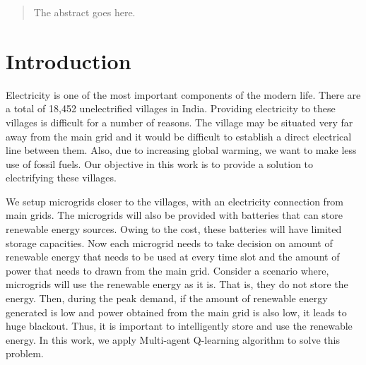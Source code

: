 \documentclass[conference]{IEEEtran}
\begin{document}
\maketitle

\begin{abstract}
The abstract goes here.
\end{abstract}





%
\IEEEpeerreviewmaketitle



\section{Introduction}

Electricity is one of the most important components of the modern life. There are a total of 18,452 unelectrified villages in India. Providing electricity to these villages is difficult for a number of reasons. The village may be situated very far away from the main grid and it would be difficult to establish a direct electrical line between them. Also, due to increasing global warming, we want to make less use of fossil fuels. Our objective in this work is to provide a solution to electrifying these villages.

We setup microgrids closer to the villages, with an electricity connection from main grids. The microgrids will also be provided with batteries that can store renewable energy sources. Owing to the cost, these batteries will have limited storage capacities. Now each microgrid needs to take decision on amount of renewable energy that needs to be used at every time slot and the amount of power that needs to drawn from the main grid. Consider a scenario where, microgrids will use the renewable energy as it is. That is, they do not store the energy. Then, during the peak demand, if the amount of renewable energy generated is low and power obtained from the main grid is also low, it leads to huge blackout. Thus, it is important to intelligently store and use the renewable energy. In this work, we apply Multi-agent Q-learning algorithm to solve this problem. 
\end{document}

